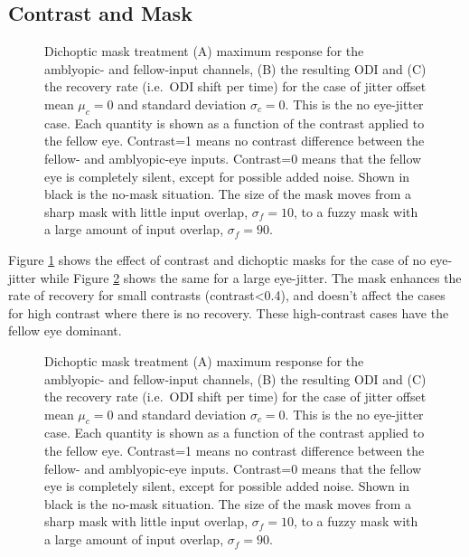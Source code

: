 \documentclass[
  onecolumn]{article}
\begin{document}
\hypertarget{contrast-and-mask}{%
\subsection{Contrast and Mask}\label{contrast-and-mask}}

\begin{figure}
\hypertarget{fig:mask-response-ODI-contrast-mu0-sigma0}{%
\centering

\caption{Dichoptic mask treatment (A) maximum response for the
amblyopic- and fellow-input channels, (B) the resulting ODI and (C) the
recovery rate (i.e.~ODI shift per time) for the case of jitter offset
mean \(\mu_c=0\) and standard deviation \(\sigma_c=0\). This is the no
eye-jitter case. Each quantity is shown as a function of the contrast
applied to the fellow eye. Contrast=1 means no contrast difference
between the fellow- and amblyopic-eye inputs. Contrast=0 means that the
fellow eye is completely silent, except for possible added noise. Shown
in black is the no-mask situation. The size of the mask moves from a
sharp mask with little input overlap, \(\sigma_f=10\), to a fuzzy mask
with a large amount of input overlap,
\(\sigma_f=90\).}\label{fig:mask-response-ODI-contrast-mu0-sigma0}
}
\end{figure}

Figure \ref{fig:mask-response-ODI-contrast-mu0-sigma0} shows the effect
of contrast and dichoptic masks for the case of no eye-jitter while
Figure \ref{fig:mask-response-ODI-contrast-mu75-sigma2} shows the same
for a large eye-jitter. The mask enhances the rate of recovery for small
contrasts (contrast\textless0.4), and doesn't affect the cases for high
contrast where there is no recovery. These high-contrast cases have the
fellow eye dominant.

\begin{figure}
\hypertarget{fig:mask-response-ODI-contrast-mu75-sigma2}{%
\centering

\caption{Dichoptic mask treatment (A) maximum response for the
amblyopic- and fellow-input channels, (B) the resulting ODI and (C) the
recovery rate (i.e.~ODI shift per time) for the case of jitter offset
mean \(\mu_c=0\) and standard deviation \(\sigma_c=0\). This is the no
eye-jitter case. Each quantity is shown as a function of the contrast
applied to the fellow eye. Contrast=1 means no contrast difference
between the fellow- and amblyopic-eye inputs. Contrast=0 means that the
fellow eye is completely silent, except for possible added noise. Shown
in black is the no-mask situation. The size of the mask moves from a
sharp mask with little input overlap, \(\sigma_f=10\), to a fuzzy mask
with a large amount of input overlap,
\(\sigma_f=90\).}\label{fig:mask-response-ODI-contrast-mu75-sigma2}
}
\end{figure}
\end{document}
